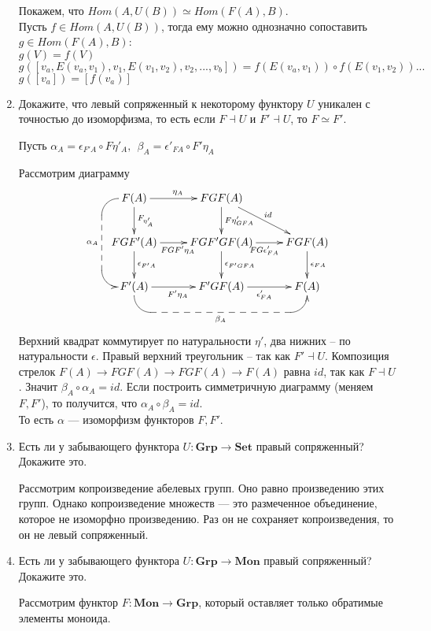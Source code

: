 \documentclass[draft]{article}
\newcommand{\cat}[1]{\mathbf{#1}}
\newcommand{\Set}{\cat{Set}}
\newcommand{\Grp}{\cat{Grp}}
\newcommand{\Mon}{\cat{Mon}}
\begin{document}
\begin{enumerate}
Покажем, что $Hom(A, U(B)) \simeq Hom(F(A), B)$. \\
Пусть $f \in Hom(A, U(B))$, тогда ему можно однозначно сопоставить $g \in Hom(F(A), B)$:\\
$g(V) = f(V)$\\
$g([v_a, E(v_a, v_1), v_1, E(v_1, v_2), v_2, ..., v_b]) = f(E(v_a, v_1)) \circ f(E(v_1, v_2)) ...$\\
$g([v_a]) = [f(v_a)]$

\item Докажите, что левый сопряженный к некоторому функтору $U$ уникален с точностью до изоморфизма, то есть если $F \dashv U$ и $F' \dashv U$, то $F \simeq F'$.

Пусть $\alpha_A = \epsilon_{F'A} \circ F\eta'_A, ~~\beta_A = \epsilon'_{FA} \circ F'\eta_A$

Рассмотрим диаграмму
\[
\xymatrix{
F(A) \ar[r]^{\eta_A} \ar @{--<} `l/15pt[d] `[dd]_{\alpha_A} [dd] \ar[d]^{F_{\eta'_A}} & FGF(A) \ar[dr]^{id} \ar[d]^{F{\eta'_{GFA}}} & \\
FGF'(A) \ar[r]_{FGF'\eta_A} \ar[d]^{\epsilon_{F'A}} & FGF'GF(A) \ar[r]_{FG\epsilon'_{FA}} \ar[d]^{\epsilon_{F'GFA}} & FGF(A) \ar[d]^{\epsilon_{FA}} \\
F'(A) \ar @{--<} `d/15pt[r] `[rr]_{\beta_A} [rr]
 \ar[r]_{F'\eta_A} & F'GF(A) \ar[r]_{\epsilon'_{FA}} & F(A)
}
\]
Верхний квадрат коммутирует по натуральности $\eta'$, два нижних -- по натуральности $\epsilon$. Правый верхний треугольник -- так как $F' \dashv U$. Композиция стрелок $F(A)\to FGF(A) \to FGF(A) \to F(A)$ равна $id$, так как $F \dashv U$. Значит $\beta_A \circ \alpha_A = id$. Если построить симметричную диаграмму (меняем $F, F'$), то получится, что $\alpha_A \circ \beta_A = id$. \\
То есть $\alpha$ --- изоморфизм функторов $F, F'$.

\item Есть ли у забывающего функтора $U : \Grp \to \Set$ правый сопряженный? Докажите это.

Рассмотрим копроизведение абелевых групп. Оно равно произведению этих групп. Однако копроизведение множеств --- это размеченное объединение, которое не изоморфно произведению. Раз он не сохраняет копроизведения, то он не левый сопряженный.

\item Есть ли у забывающего функтора $U : \Grp \to \Mon$ правый сопряженный? Докажите это.

Рассмотрим функтор $F : \Mon \to \Grp$, который оставляет только обратимые 
элементы моноида.


\end{enumerate}
\end{document}

